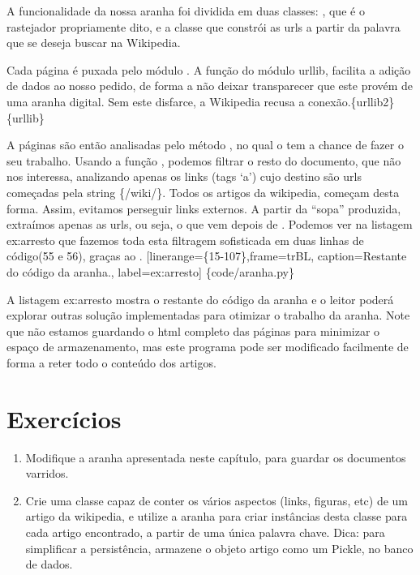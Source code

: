 \documentclass[a4paper,10pt,portuguese]{sphinxmanual}
\begin{document}
A funcionalidade da nossa aranha foi dividida em duas classes:
, que é o rastejador propriamente dito, e a classe
 que constrói as urls a partir da palavra que se deseja
buscar na Wikipedia.

Cada página é puxada pelo módulo . A função
 do módulo urllib, facilita a adição de dados ao nosso
pedido, de forma a não deixar transparecer que este provém de uma
aranha digital. Sem este disfarce, a Wikipedia recusa a
conexão.\{urllib2\}\{urllib\}

A páginas são então analisadas pelo método , no qual o
 tem a chance de fazer o seu trabalho. Usando a
função , podemos filtrar o resto do documento, que
não nos interessa, analizando apenas os links (tags `a') cujo
destino são urls começadas pela string \{/wiki/\}. Todos os artigos
da wikipedia, começam desta forma. Assim, evitamos perseguir links
externos. A partir da ``sopa'' produzida, extraímos apenas as urls,
ou seja, o que vem depois de . Podemos ver na listagem
ex:arresto que fazemos toda esta filtragem sofisticada em duas
linhas de código(55 e 56), graças ao .
{[}linerange=\{15-107\},frame=trBL, caption=Restante do código da aranha., label=ex:arresto{]} \{code/aranha.py\}

A listagem ex:arresto mostra o restante do código da aranha e o
leitor poderá explorar outras solução implementadas para otimizar o
trabalho da aranha. Note que não estamos guardando o html completo
das páginas para minimizar o espaço de armazenamento, mas este
programa pode ser modificado facilmente de forma a reter todo o
conteúdo dos artigos.


\chapter{Exercícios}
\label{capbd:exercicios}\begin{enumerate}
\item {} 
Modifique a aranha apresentada neste capítulo, para guardar os
documentos varridos.

\item {} 
Crie uma classe capaz de conter os vários aspectos (links, figuras,
etc) de um artigo da wikipedia, e utilize a aranha para criar
instâncias desta classe para cada artigo encontrado, a partir de
uma única palavra chave. Dica: para simplificar a persistência,
armazene o objeto artigo como um Pickle, no banco de dados.

\end{enumerate}
\end{document}
